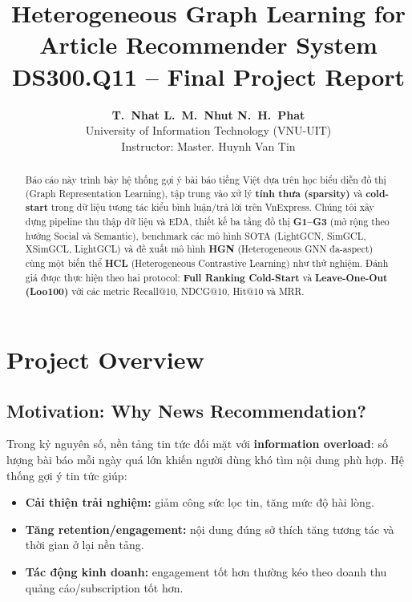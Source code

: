 \documentclass[11pt]{article}
\title{\textbf{Heterogeneous Graph Learning for Article Recommender System}\\
\large DS300.Q11 -- Final Project Report}
\author{
\textbf{T.~Nhat \quad L.~M.~Nhut \quad N.~H.~Phat}\\
University of Information Technology (VNU-UIT)\\
Instructor: Master. Huynh Van Tin
}
\date{} %
\begin{document}
\maketitle

\vspace{-0.3cm}
\begin{abstract}
\noindent
Báo cáo này trình bày hệ thống gợi ý bài báo tiếng Việt dựa trên học biểu diễn đồ thị (Graph Representation Learning), tập trung vào xử lý \textbf{tính thưa (sparsity)} và \textbf{cold-start} trong dữ liệu tương tác kiểu bình luận/trả lời trên VnExpress. Chúng tôi xây dựng pipeline thu thập dữ liệu và EDA, thiết kế ba tầng đồ thị \textbf{G1--G3} (mở rộng theo hướng Social và Semantic), benchmark các mô hình SOTA (LightGCN, SimGCL, XSimGCL, LightGCL) và đề xuất mô hình \textbf{HGN} (Heterogeneous GNN đa-aspect) cùng một biến thể \textbf{HCL} (Heterogeneous Contrastive Learning) như thử nghiệm. Đánh giá được thực hiện theo hai protocol: \textbf{Full Ranking Cold-Start} và \textbf{Leave-One-Out (Loo100)} với các metric Recall@10, NDCG@10, Hit@10 và MRR.
\end{abstract}

\newpage

\section{Project Overview}
\label{sec:overview}

\subsection{Motivation: Why News Recommendation?}
Trong kỷ nguyên số, nền tảng tin tức đối mặt với \textbf{information overload}: số lượng bài báo mỗi ngày quá lớn khiến người dùng khó tìm nội dung phù hợp. Hệ thống gợi ý tin tức giúp:
\begin{itemize}
  \item \textbf{Cải thiện trải nghiệm:} giảm công sức lọc tin, tăng mức độ hài lòng.
  \item \textbf{Tăng retention/engagement:} nội dung đúng sở thích tăng tương tác và thời gian ở lại nền tảng.
  \item \textbf{Tác động kinh doanh:} engagement tốt hơn thường kéo theo doanh thu quảng cáo/subscription tốt hơn.
\end{itemize}
\end{document}
